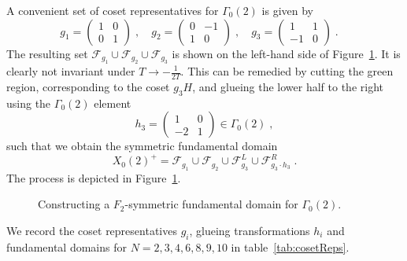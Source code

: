 \documentclass[11pt,a4paper]{article}
\numberwithin{equation}{section}
\numberwithin{table}{section}\setlength{\multlinegap}{25pt}
\begin{document}
A convenient set of coset representatives for $\Gamma_0(2)$ is given by
\begin{equation}
    g_1=
    \begin{pmatrix}
        1&0\\
        0&1
    \end{pmatrix}\;,\quad
    g_2=
    \begin{pmatrix}
        0&-1\\
        1&0
    \end{pmatrix}\;,\quad
    g_3=
    \begin{pmatrix}
        1&1\\
        -1&0
    \end{pmatrix}\;.\quad
\end{equation}
The resulting set $\mathcal{F}_{g_1}\cup\mathcal{F}_{g_2}\cup\mathcal{F}_{g_3}$ is shown on the left-hand side of Figure~\ref{fig:cutAndGlueIllustration}. It is clearly not invariant under $T\to-\tfrac{1}{2T}$. This can be remedied by cutting the green region, corresponding to the coset $g_3H$, and glueing the lower half to the right using the $\Gamma_0(2)$ element
\begin{equation}
    h_3=
    \begin{pmatrix}
        1&0\\
        -2&1
    \end{pmatrix}
    \in \Gamma_0(2)\;,
\end{equation}
such that we obtain the symmetric fundamental domain
\begin{equation}
    X_0(2)^+=\mathcal{F}_{g_1}\cup\mathcal{F}_{g_2}\cup\mathcal{F}^L_{g_3}\cup\mathcal{F}^R_{g_3\cdot h_3}\;.
\end{equation}
The process is depicted in Figure~\ref{fig:cutAndGlueIllustration}.

\begin{figure}
    \centering
    \caption{Constructing a $F_2$-symmetric fundamental domain for $\Gamma_0(2)$.}
    \label{fig:cutAndGlueIllustration}
\end{figure}

We record the coset representatives $g_i$, glueing transformations $h_i$ and fundamental domains for $N=2,3,4,6,8,9,10$ in table~\ref{tab:cosetReps}.
\end{document}
